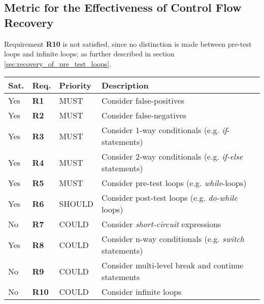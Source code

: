 
\subsection{Metric for the Effectiveness of Control Flow Recovery}
\label{sec:cfa_metric}



Requirement \textbf{R10} is not satisfied, since no distinction is made between pre-test loops and infinite loops; as further described in section \ref{sec:recovery_of_pre_test_loops}.

\begin{table}[htbp]
	\begin{center}
		\begin{tabular}{|l|l|l|l|}
			\hline
			Sat. & Req. & Priority & Description \\
			\hline
			\rowcolor{light_green_3}
			Yes & \textbf{R1} & MUST & Consider false-positives \\
			\rowcolor{light_green_3}
			Yes & \textbf{R2} & MUST & Consider false-negatives \\
			\rowcolor{light_green_3}
			Yes & \textbf{R3} & MUST & Consider 1-way conditionals (e.g. \textit{if}-statements) \\
			\rowcolor{light_green_3}
			Yes & \textbf{R4} & MUST & Consider 2-way conditionals (e.g. \textit{if-else} statements) \\
			\rowcolor{light_green_3}
			Yes & \textbf{R5} & MUST & Consider pre-test loops (e.g. \textit{while}-loops) \\
			\hline
			\rowcolor{light_green_3}
			Yes & \textbf{R6} & SHOULD & Consider post-test loops (e.g. \textit{do-while} loops) \\
			\hline
			\rowcolor{light_red_3}
			No & \textbf{R7} & COULD & Consider \textit{short-circuit} expressions \\
			\rowcolor{light_green_3}
			Yes & \textbf{R8} & COULD & Consider n-way conditionals (e.g. \textit{switch} statements) \\
			\rowcolor{light_red_3}
			No & \textbf{R9} & COULD & Consider multi-level break and continue statements \\
			\rowcolor{light_red_3}
			No & \textbf{R10} & COULD & Consider infinite loops \\

\end{tabular}
\end{center}
\end{table}
